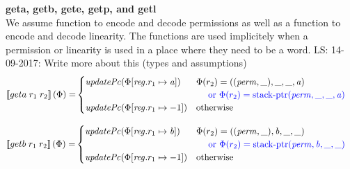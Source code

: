 \documentclass[a4paper]{article}
\newcommand\lau[1]{{\color{purple} \sf \footnotesize {LS: #1}}\\}
\newcommand{\sem}[1]{\left\llbracket #1 \right\rrbracket}
\newcommand{\tor}{\text{ or }}
\newcommand{\totherwise}{\text{otherwise }}
\newcommand{\sourcecolor}[1]{\color{blue}}
\newcommand{\src}[1]{{\sourcecolor{} #1}}
\newcommand{\targetcolor}[1]{\color{black}}
\newcommand{\trg}[1]{{\targetcolor{} #1}}
\newcommand{\zinstr}[1]{#1}
\newcommand{\twoinstr}[3]{
  \ifthenelse{\equal{#2#3}{}}
  {\zinstr{#1}}
  {\zinstr{#1} \; #2 \; #3}
}
\newcommand{\tgeta}[2]{\twoinstr{\trg{geta}}{#1}{#2}}
\newcommand{\tgetb}[2]{\twoinstr{\trg{getb}}{#1}{#2}}
\newcommand{\update}[2]{[#1 \mapsto #2]}
\newcommand{\updReg}[2]{\update{\reg.#1}{#2}}
\newcommand{\perm}{\var{perm}}
\newcommand{\stkptr}[1]{\mathrm{stack\text{-}ptr}(#1)}
\newcommand{\var}[1]{\mathit{#1}}
\newcommand{\reg}{\var{reg}}
\newcommand{\baddr}{\var{b}}
\newcommand{\aaddr}{\var{a}}
\newcommand{\plainfun}[2]{
  \ifthenelse{\equal{#2}{}}
  {\mathit{#1}}
  {\mathit{#1}(#2)}
}
\newcommand{\updPcAddr}[1]{\plainfun{updatePc}{#1}}
\begin{document}
\noindent\textbf{geta, getb, gete, getp, and getl}\\
We assume function to encode and decode permissions as well as a function to encode and decode linearity. The functions are used implicitely when a permission or linearity is used in a place where they need to be a word.
\lau{14-09-2017: Write more about this (types and assumptions)}
\begin{align*}
  \sem{\tgeta{r_1}{r_2}}(\Phi) = & 
                                   \begin{cases}
                                     \updPcAddr{\Phi\updReg{r_1}{\aaddr}} & 
                                     \arraycolsep=0pt
                                     \begin{array}[t]{l}
                                       \Phi(r_2) = ((\perm,\_),\_,\_,\aaddr) \\
                                       \quad \src{\tor \Phi(r_2) = \stkptr{\perm,\_,\_,\aaddr} } \\
                                     \end{array} \\
                                     \updPcAddr{\Phi\updReg{r_1}{-1}} & \totherwise
                                   \end{cases}
\end{align*}

\begin{align*}
  \sem{\tgetb{r_1}{r_2}}(\Phi) = & 
                                   \begin{cases}
                                     \updPcAddr{\Phi\updReg{r_1}{\baddr}} & 
                                     \arraycolsep=0pt
                                     \begin{array}[t]{l}
                                       \Phi(r_2) = ((\perm,\_),\baddr,\_,\_) \\
                                       \quad \src{\tor \Phi(r_2) = \stkptr{\perm,\baddr,\_,\_} } \\
                                     \end{array} \\
                                     \updPcAddr{\Phi\updReg{r_1}{-1}} & \totherwise
                                   \end{cases}
\end{align*}
\end{document}
